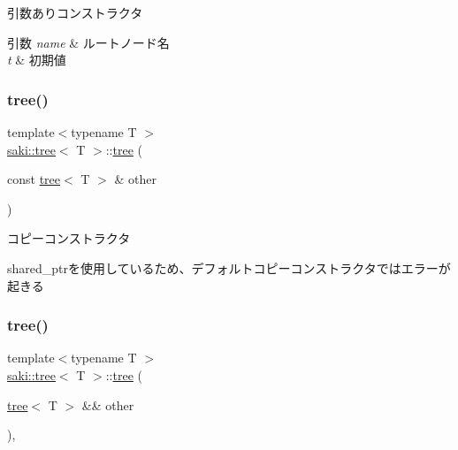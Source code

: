 引数ありコンストラクタ 


\begin{DoxyParams}{引数}
{\em name} & ルートノード名 \\
\hline
{\em t} & 初期値 \\
\hline
\end{DoxyParams}
\mbox{\label{classsaki_1_1tree_ade3fa86e8bd2b2d22b3ec7da24f915b6}} 
\subsubsection{\texorpdfstring{tree()}{tree()}\hspace{0.1cm}{\footnotesize\ttfamily [2/3]}}
{\footnotesize\ttfamily template$<$typename T $>$ \\
\mbox{\hyperlink{classsaki_1_1tree}{saki\+::tree}}$<$ T $>$\+::\mbox{\hyperlink{classsaki_1_1tree}{tree}} (\begin{DoxyParamCaption}\item[{const \mbox{\hyperlink{classsaki_1_1tree}{tree}}$<$ T $>$ \&}]{other }\end{DoxyParamCaption})\hspace{0.3cm}{\ttfamily [inline]}}



コピーコンストラクタ 

shared\+\_\+ptrを使用しているため、デフォルトコピーコンストラクタではエラーが起きる \mbox{\label{classsaki_1_1tree_a4f1e3143448f197379d7d369270a386a}} 
\subsubsection{\texorpdfstring{tree()}{tree()}\hspace{0.1cm}{\footnotesize\ttfamily [3/3]}}
{\footnotesize\ttfamily template$<$typename T $>$ \\
\mbox{\hyperlink{classsaki_1_1tree}{saki\+::tree}}$<$ T $>$\+::\mbox{\hyperlink{classsaki_1_1tree}{tree}} (\begin{DoxyParamCaption}\item[{\mbox{\hyperlink{classsaki_1_1tree}{tree}}$<$ T $>$ \&\&}]{other }\end{DoxyParamCaption})\hspace{0.3cm}{\ttfamily [inline]}, {\ttfamily [noexcept]}}



